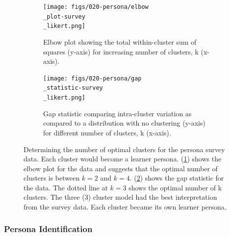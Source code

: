 \documentclass[020-persona\_validation.tex]{subfiles}
\begin{document}
        \begin{figure}[!hbtp]
            \centering
            \begin{subfigure}[h]{0.45\textwidth}
                \centering
                \texttt{[image: figs/020-persona/elbow\\\_plot-survey\\\_likert.png]}
                \caption[Elbow plot for determining optimal number of clusters.]
                {Elbow plot showing the total within-cluster sum of squares (y-axis) for increasing number of clusters, k (x-axis).
                }
                \label{sfig:cluster-elbow}
            \end{subfigure}
            \begin{subfigure}[h]{0.45\textwidth}
                \centering
                \texttt{[image: figs/020-persona/gap\\\_statistic-survey\\\_likert.png]}
                \caption[Gap statistic for determining optimal number of clusters.]
                {Gap statistic comparing
                    intra-cluster variation as compared to a distribution with no clustering (y-axis)
                    for different number of clusters, k (x-axis).
                }
                \label{sfig:cluster-gap}
            \end{subfigure}
            \caption[Elbow plot and Gap statistic for optimal number of clusters.]
            {Determining the number of optimal clusters for the persona survey data.
                Each cluster would become a learner persona.
                (\ref{sfig:cluster-elbow}) shows the elbow plot for the data and
                suggests that the optimal number of clusters is between $k=2$ and $k=4$.
                (\ref{sfig:cluster-gap}) shows the gap statistic for the data.
                The dotted line at $k=3$ shows the optimal number of k clusters.
                The three (3) cluster model had the best interpretation from the survey data.
                Each cluster became its own learner persona.
            }
        \label{fig:cluster-gap-elbow}
        \end{figure}

    \subsubsection{Persona Identification}
\end{document}
